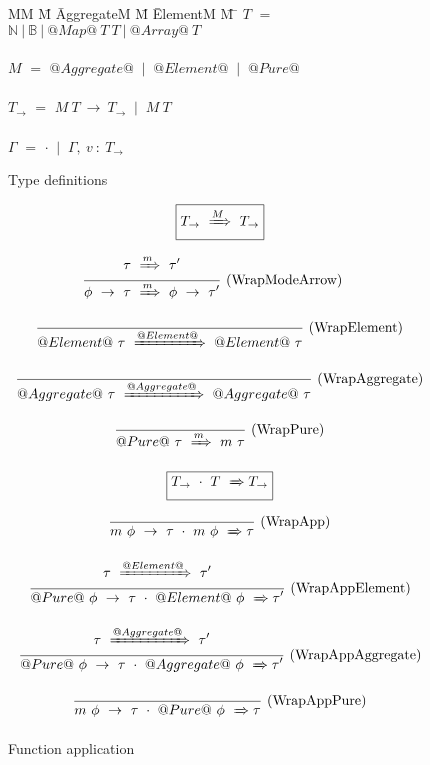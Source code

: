 
\begin{figure}

\begin{tabbing}
MM \= M \= AggregateM \= M \= ElementM \= M \= \kill
$T$
    \> $=$  \> $\mathbb{N}~|~\mathbb{B}~|~@Map@~T~T~|~@Array@~T$ \\
\\
$M$
    \> $=$  \> $@Aggregate@$
    \> $~|~$ \> $@Element@$
    \> $~|~$ \> $@Pure@$         \\
\\
$T_{\to}$
    \> $=$  
            \> $M~T~\to~T_{\to}$
            \> $~|~$
            \> $M~T$ \\
\\
$\Gamma$
    \> $=$  
            \> $\cdot$
            \> $~|~$
            \> $\Gamma,~v~:~T_\to$ \\
\end{tabbing}

\caption{Type definitions}
\label{fig:source:type:defs}
\end{figure}


\begin{figure}

$$
\boxed{T_{\to} ~\xRightarrow{M}~ T_{\to}}
$$

$$
\frac {\displaystyle 
    \tau ~\xRightarrow{m}~ \tau'
} {\displaystyle 
    \phi~\to~\tau ~\xRightarrow{m}~ \phi~\to~\tau'
} \ 
\textrm{(WrapModeArrow)}
\quad
$$

$$
\frac {\displaystyle  } {\displaystyle 
    @Element@~\tau ~\xRightarrow{@Element@}~ @Element@~\tau
} \ 
\textrm{(WrapElement)}
$$

$$
\frac {\displaystyle  } {\displaystyle 
    @Aggregate@~\tau ~\xRightarrow{@Aggregate@}~ @Aggregate@~\tau
} \ 
\textrm{(WrapAggregate)}
$$

$$
\frac {\displaystyle  } {\displaystyle 
    @Pure@~\tau ~\xRightarrow{m}~ m~\tau
} \ 
\textrm{(WrapPure)}
$$


$$
\boxed{T_{\to}~\cdot~T ~\xRightarrow~ T_{\to}}
$$

$$
\frac {\displaystyle 
} {\displaystyle 
    m~\phi~\to~\tau~\cdot~m~\phi ~\xRightarrow~ \tau
} \ 
\textrm{(WrapApp)}
$$


$$
\frac {\displaystyle 
    \tau ~\xRightarrow{@Element@}~ \tau'
} {\displaystyle 
    @Pure@~\phi~\to~\tau~\cdot~@Element@~\phi ~\xRightarrow~ \tau'
} \ 
\textrm{(WrapAppElement)}
$$

$$
\frac {\displaystyle 
    \tau ~\xRightarrow{@Aggregate@}~ \tau'
} {\displaystyle 
    @Pure@~\phi~\to~\tau~\cdot~@Aggregate@~\phi ~\xRightarrow~ \tau'
} \ 
\textrm{(WrapAppAggregate)}
$$

$$
\frac {\displaystyle 
} {\displaystyle 
    m~\phi~\to~\tau~\cdot~@Pure@~\phi ~\xRightarrow~ \tau
} \ 
\textrm{(WrapAppPure)}
$$


\caption{Function application}
\label{fig:source:type:wrap}
\end{figure}

